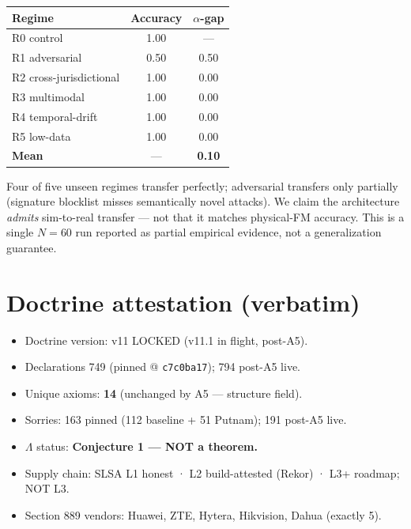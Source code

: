 \documentclass[11pt]{article}
\newcommand{\Lam}{\ensuremath{\Lambda}}
\begin{document}
\begin{center}\small
\begin{tabular}{@{}lcc@{}}
\toprule
Regime & Accuracy & $\alpha$-gap \\
\midrule
R0 control & 1.00 & --- \\
R1 adversarial & 0.50 & 0.50 \\
R2 cross-jurisdictional & 1.00 & 0.00 \\
R3 multimodal & 1.00 & 0.00 \\
R4 temporal-drift & 1.00 & 0.00 \\
R5 low-data & 1.00 & 0.00 \\
\midrule
\textbf{Mean} & --- & \textbf{0.10} \\
\bottomrule
\end{tabular}
\end{center}

\noindent Four of five unseen regimes transfer perfectly; adversarial transfers only partially (signature
blocklist misses semantically novel attacks). We claim the architecture \emph{admits} sim-to-real
transfer --- not that it matches physical-FM accuracy. This is a single $N{=}60$ run reported as
partial empirical evidence, not a generalization guarantee.

\section{Doctrine attestation (verbatim)}
\begin{itemize}\setlength\itemsep{0pt}
  \item Doctrine version: v11 LOCKED (v11.1 in flight, post-A5).
  \item Declarations 749 (pinned @ \texttt{c7c0ba17}); 794 post-A5 live.
  \item Unique axioms: \textbf{14} (unchanged by A5 --- structure field).
  \item Sorries: 163 pinned (112 baseline + 51 Putnam); 191 post-A5 live.
  \item \Lam{} status: \textbf{Conjecture 1 --- NOT a theorem.}
  \item Supply chain: SLSA L1 honest · L2 build-attested (Rekor) · L3+ roadmap; NOT L3.
  \item Section 889 vendors: Huawei, ZTE, Hytera, Hikvision, Dahua (exactly 5).
\end{itemize}
\end{document}
